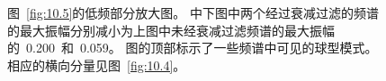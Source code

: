 \begin{figure}
\begin{center}
\end{center}
\caption[thrust zoom2]{
\label{fig:10.6}
图~\protect\ref{fig:10.5}的低频部分放大图。
中下图中两个经过衰减过滤的频谱的最大振幅分别减小为上图中未经衰减过滤频谱的最大振幅的~0.200~和~0.059。
图的顶部标示了一些频谱中可见的球型模式。
相应的横向分量见图~\protect\ref{fig:10.4}。}
\end{figure}
